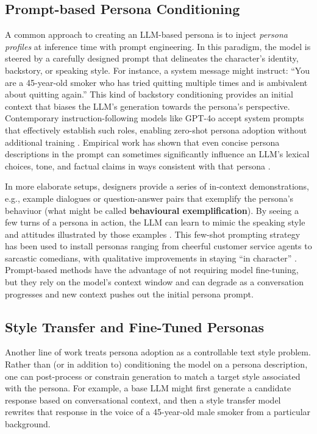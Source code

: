 \subsection{Prompt-based Persona Conditioning} 
A common approach to creating an LLM-based persona is to inject \emph{persona profiles} at inference time with prompt engineering. In this paradigm, the model is steered by a carefully designed prompt that delineates the character's identity, backstory, or speaking style. For instance, a system message might instruct: ``You are a 45-year-old smoker who has tried quitting multiple times and is ambivalent about quitting again.'' This kind of backstory conditioning provides an initial context that biases the LLM's generation towards the persona’s perspective. Contemporary instruction-following models like GPT-4o accept system prompts that effectively establish such roles, enabling zero-shot persona adoption without additional training \cite{10.5555/3600270.3602281}. Empirical work has shown that even concise persona descriptions in the prompt can sometimes significantly influence an LLM's lexical choices, tone, and factual claims in ways consistent with that persona \cite{madotto-etal-2019-personalizing, liu-etal-2024-evaluating-large}.

In more elaborate setups, designers provide a series of in-context demonstrations, e.g., example dialogues or question-answer pairs that exemplify the persona's behaviuor (what might be called \textbf{behavioural exemplification}). By seeing a few turns of a persona in action, the LLM can learn to mimic the speaking style and attitudes illustrated by those examples \cite{joshi-etal-2023-persona}. This few-shot prompting strategy has been used to install personas ranging from cheerful customer service agents to sarcastic comedians, with qualitative improvements in staying ``in character'' \cite{gururangan-etal-2020-dont, yang-etal-2023-large}. Prompt-based methods have the advantage of not requiring model fine-tuning, but they rely on the model's context window and can degrade as a conversation progresses and new context pushes out the initial persona prompt.

\subsection{Style Transfer and Fine-Tuned Personas} 
Another line of work treats persona adoption as a controllable text style problem. Rather than (or in addition to) conditioning the model on a persona description, one can post-process or constrain generation to match a target style associated with the persona. For example, a base LLM might first generate a candidate response based on conversational context, and then a style transfer model rewrites that response in the voice of a 45-year-old male smoker from a particular background.

